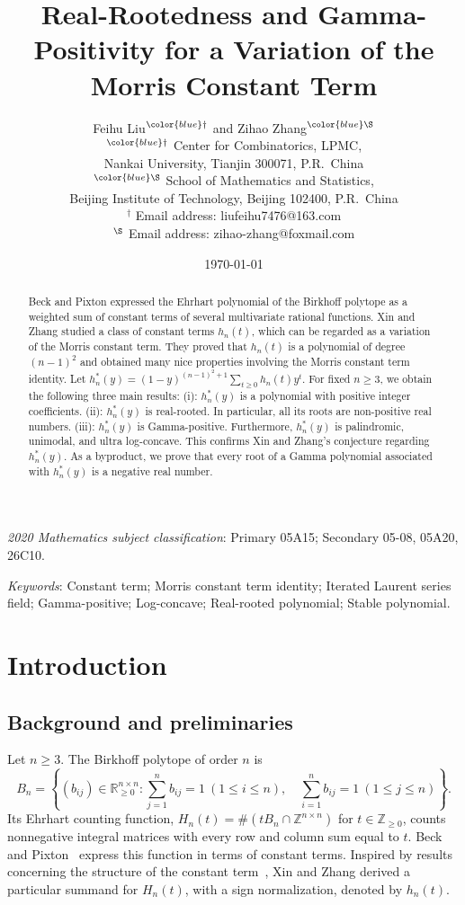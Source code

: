 \documentclass[reqno, 12pt]{article}
\title{Real-Rootedness and Gamma-Positivity for a Variation of the Morris Constant Term}
\author{Feihu Liu$^{\color{blue} \dag}$ and Zihao Zhang$^{\color{blue} \S}$
\\[2mm]
{\small $^{\color{blue} \dag}$ Center for Combinatorics, LPMC,}\\[-0.8ex]
{\small Nankai University, Tianjin 300071, P.R.~China}\\
{\small $^{\color{blue} \S}$ School of Mathematics and Statistics,}\\[-0.8ex]
{\small Beijing Institute of Technology, Beijing 102400, P.R.~China}\\
{\small {\color{blue} $^\dag$} Email address: liufeihu7476@163.com}\\
{\small {\color{blue} $^\S$} Email address: zihao-zhang@foxmail.com}\\
}
\date{\today}
\numberwithin{equation}{section}
\theoremstyle{definition}
\newcommand{\NN}{\mathbb Z_{\geq0}}
\newcommand{\ZZ}{\mathbb Z}
\newcommand{\RR}{\mathbb R}
\begin{document}
\maketitle

\begin{abstract}
Beck and Pixton expressed the Ehrhart polynomial of the Birkhoff polytope as a weighted sum of constant terms of several multivariate rational functions. Xin and Zhang studied a class of constant terms $h_n(t)$, which can be regarded as a variation of the Morris constant term. They proved that $h_n(t)$ is a polynomial of degree $(n-1)^2$ and obtained many nice properties involving the Morris constant term identity. Let $h_n^*(y)=(1-y)^{(n-1)^2+1}\sum_{t\geq0}h_n(t)y^t$. For fixed $n\geq 3$, we obtain the following three main results: 
(i): $h_n^*(y)$ is a polynomial with positive integer coefficients.
(ii): $h_n^*(y)$ is real-rooted. In particular, all its roots are non-positive real numbers.
(iii): $h_n^*(y)$ is Gamma-positive.
Furthermore, $h_n^*(y)$ is palindromic, unimodal, and ultra log-concave.
This confirms Xin and Zhang's conjecture regarding $h_n^*(y)$. As a byproduct, we prove that every root of a Gamma polynomial associated with $h_n^*(y)$ is a negative real number.
\end{abstract}

\noindent
\begin{small}
\emph{2020 Mathematics subject classification}: Primary 05A15; Secondary 05-08, 05A20, 26C10.
\end{small}

\noindent
\begin{small}
\emph{Keywords}: Constant term; Morris constant term identity; Iterated Laurent series field; Gamma-positive; Log-concave; Real-rooted polynomial; Stable polynomial.
\end{small}

\tableofcontents


\section{Introduction}

\subsection{Background and preliminaries}

Let $n\geq3$.  The Birkhoff polytope of order $n$ is
\[
B_n=\left\{(b_{ij})\in\RR_{\geq0}^{n\times n}:
 \sum_{j=1}^n b_{ij}=1\ (1\leq i\leq n),\quad
 \sum_{i=1}^n b_{ij}=1\ (1\leq j\leq n)\right\}.
\]
Its Ehrhart counting function,
$H_n(t)=\#(tB_n\cap\ZZ^{n\times n})$ for $t\in\NN$,
counts nonnegative integral matrices with every row and column sum
equal to $t$.  Beck and Pixton~\cite{BeckPixton} express this
function in terms of constant terms.  
Inspired by results concerning the structure of the constant term~\cite{xin2022},  Xin and Zhang \cite[Section~1]{XZ} derived a particular summand for $H_n(t)$, with a sign normalization, denoted by $h_n(t)$.
\end{document}
